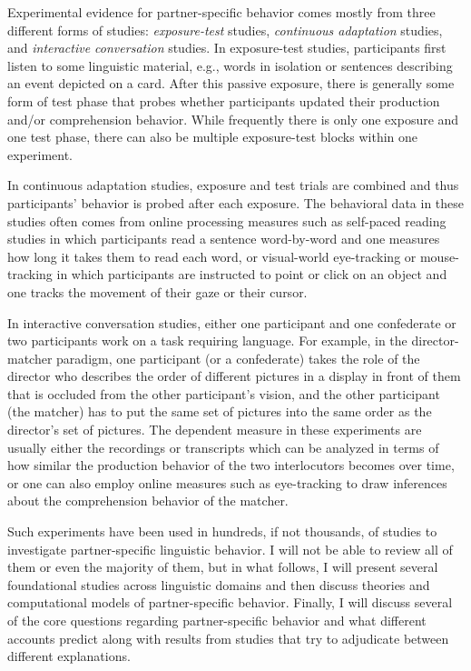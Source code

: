 Experimental evidence for partner-specific behavior comes mostly from three different forms of studies: \textit{exposure-test} studies, \textit{continuous adaptation} studies, and \textit{interactive conversation} studies.
In exposure-test studies, participants first listen to some linguistic material,  e.g., words in isolation or sentences describing an event depicted on a card.  After this passive exposure, there is generally
some form of test phase that probes whether participants updated their production and/or comprehension behavior. While frequently there is only one exposure and one test phase, there can also be multiple
exposure-test blocks within one experiment.

In continuous adaptation studies, exposure and test trials are combined and thus participants' behavior is probed after each exposure. The behavioral data in these studies often comes from online processing measures such as self-paced reading studies in which participants read a sentence word-by-word and one measures how long it takes them to read each word, or visual-world eye-tracking \cite{Tanenhaus} or mouse-tracking \cite{e.g., roettgerFranke} in which participants are instructed to point or click on an object and one tracks the movement of their gaze or their cursor.

In interactive conversation studies, either one participant and one confederate or two participants work on a task requiring language. For example, in the director-matcher paradigm, one participant (or a confederate) takes the role of the director who describes the order of different pictures in a display in front of them that is occluded from the other participant's vision, and the other participant (the matcher) has to put the same set of pictures into the same order 
as the director's set of pictures. The dependent measure in these experiments are usually either the recordings or transcripts which can be analyzed in terms of how similar the production behavior of the two interlocutors becomes over time, or one can also employ online measures such as eye-tracking to draw inferences about the comprehension behavior of the matcher.

Such experiments have been used in hundreds, if not thousands, of studies to investigate partner-specific linguistic behavior. I will not be able to review all of them or even the majority of them, but in what follows, I will present several foundational studies across linguistic domains and then discuss theories and computational models of partner-specific behavior. Finally, I will discuss several of the core questions regarding partner-specific behavior and what different accounts predict along with results from studies that try to adjudicate between different explanations. 

